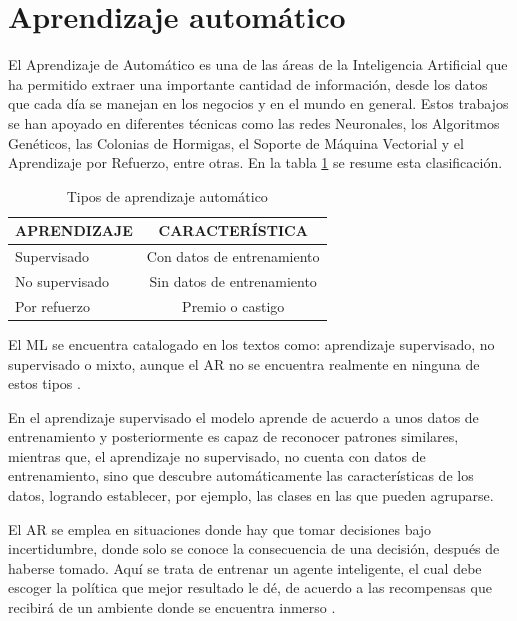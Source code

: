 \section{Aprendizaje automático}
El Aprendizaje de Automático es una de las áreas de la Inteligencia Artificial que ha permitido extraer una importante cantidad de información, desde los datos que cada día se manejan en los negocios y en el mundo en general. Estos trabajos se han apoyado en diferentes técnicas como las redes Neuronales, los Algoritmos Genéticos, las Colonias de Hormigas, el Soporte de Máquina Vectorial y el Aprendizaje por Refuerzo, entre otras. En la tabla \ref{tipoML} se resume esta clasificación.

\begin{table}[H]
\caption{Tipos de aprendizaje automático}
\centering
\begin{tabular}{lc}
\multicolumn{1}{c}{\textbf{APRENDIZAJE}} & \textbf{CARACTERÍSTICA}                         \\ \hline
\multicolumn{1}{|l|}{Supervisado}        & \multicolumn{1}{c|}{Con datos de entrenamiento} \\ \hline
\multicolumn{1}{|l|}{No supervisado}     & \multicolumn{1}{c|}{Sin datos de entrenamiento} \\ \hline
\multicolumn{1}{|l|}{Por refuerzo}       & \multicolumn{1}{c|}{Premio o castigo}           \\ \hline
\end{tabular}
\label{tipoML}
\end{table}

El ML se encuentra catalogado en los textos como: aprendizaje supervisado, no supervisado o mixto, aunque el AR no se encuentra realmente en ninguna de estos tipos \citep{russell2004inteligencia}. 

En el aprendizaje supervisado el modelo aprende de acuerdo a unos datos de entrenamiento y posteriormente es capaz de reconocer patrones similares, mientras que, el aprendizaje no supervisado, no cuenta con datos de entrenamiento, sino que descubre automáticamente las características de los datos, logrando establecer, por ejemplo, las clases en las que pueden agruparse.

El AR se emplea en situaciones donde hay que tomar decisiones bajo incertidumbre, donde solo se conoce la consecuencia de una decisión, después de haberse tomado. Aquí se trata de entrenar un agente inteligente, el cual debe escoger la política que mejor resultado le dé, de acuerdo a las recompensas que recibirá de un ambiente donde se encuentra inmerso \citep{sutton1992reinforcement}.

